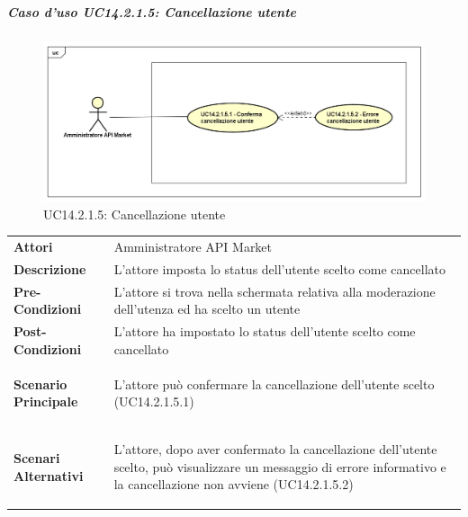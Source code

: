 \newpage
\subparagraph{Caso d'uso UC14.2.1.5: Cancellazione utente}
\label{UC14_2_1_5}
\begin{figure}[ht]
	\centering
	\includegraphics[scale=0.45]{UML/UC14_2_1_5.png}
	\caption{UC14.2.1.5: Cancellazione utente}
\end{figure}

\begin{minipage}{\linewidth}
	\begin{tabular}{ l | p{11cm}}
		\hline
		\rowcolor{Gray}
		\multicolumn{2}{c}{UC14.2.1.5 - Cancellazione utente} \\
		\hline
		\textbf{Attori} & Amministratore API Market \\
		\textbf{Descrizione} & L'attore imposta lo status dell'utente scelto come cancellato \\
		\textbf{Pre-Condizioni} & L'attore si trova nella schermata relativa alla moderazione dell'utenza ed ha scelto un utente \\
		\textbf{Post-Condizioni} & L'attore ha impostato lo status dell'utente scelto come cancellato \\
		\textbf{Scenario Principale} & 
		\begin{enumerate*}[label=(\arabic*.),itemjoin={\newline}]
			\item L'attore può confermare la cancellazione dell'utente scelto (UC14.2.1.5.1)
		\end{enumerate*}\\
		\textbf{Scenari Alternativi} & 
		\begin{enumerate*}[label=(\arabic*.),itemjoin={\newline}]
			\item L'attore, dopo aver confermato la cancellazione dell'utente scelto, può visualizzare un messaggio di errore informativo e la cancellazione non avviene (UC14.2.1.5.2)
		\end{enumerate*}\\
	\end{tabular}
\end{minipage}

